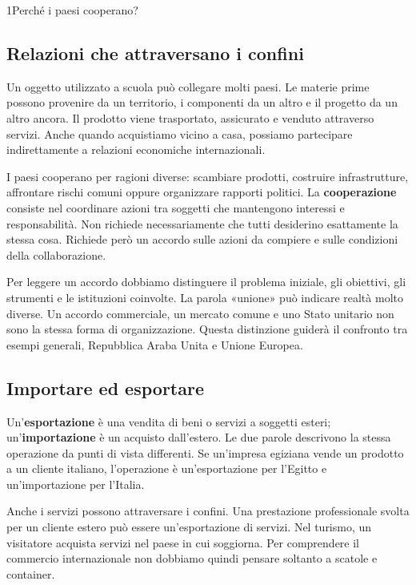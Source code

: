 
\begin{lettura}{1}{Perché i paesi cooperano?}


\subsection*{Relazioni che attraversano i confini}
Un oggetto utilizzato a scuola può collegare molti paesi. Le materie prime possono provenire da un territorio, i componenti da un altro e il progetto da un altro ancora. Il prodotto viene trasportato, assicurato e venduto attraverso servizi. Anche quando acquistiamo vicino a casa, possiamo partecipare indirettamente a relazioni economiche internazionali.

I paesi cooperano per ragioni diverse: scambiare prodotti, costruire infrastrutture, affrontare rischi comuni oppure organizzare rapporti politici. La \textbf{cooperazione} consiste nel coordinare azioni tra soggetti che mantengono interessi e responsabilità. Non richiede necessariamente che tutti desiderino esattamente la stessa cosa. Richiede però un accordo sulle azioni da compiere e sulle condizioni della collaborazione.

Per leggere un accordo dobbiamo distinguere il problema iniziale, gli obiettivi, gli strumenti e le istituzioni coinvolte. La parola «unione» può indicare realtà molto diverse. Un accordo commerciale, un mercato comune e uno Stato unitario non sono la stessa forma di organizzazione. Questa distinzione guiderà il confronto tra esempi generali, Repubblica Araba Unita e Unione Europea.

\subsection*{Importare ed esportare}
Un'\textbf{esportazione} è una vendita di beni o servizi a soggetti esteri; un'\textbf{importazione} è un acquisto dall'estero. Le due parole descrivono la stessa operazione da punti di vista differenti. Se un'impresa egiziana vende un prodotto a un cliente italiano, l'operazione è un'esportazione per l'Egitto e un'importazione per l'Italia.

Anche i servizi possono attraversare i confini. Una prestazione professionale svolta per un cliente estero può essere un'esportazione di servizi. Nel turismo, un visitatore acquista servizi nel paese in cui soggiorna. Per comprendere il commercio internazionale non dobbiamo quindi pensare soltanto a scatole e container.


\end{lettura}
